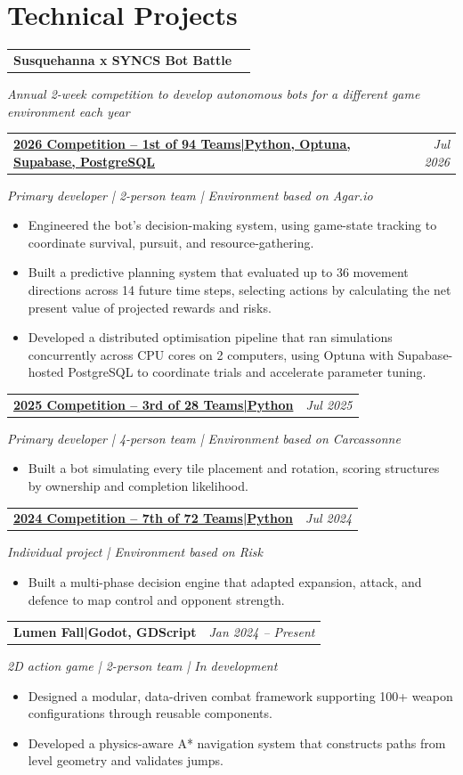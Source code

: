 \documentclass[10pt,a4paper]{article}
\makeatletter
\newcommand{\projectgroup}[2]{%
  \vspace{3pt}
  \begin{tabularx}{\textwidth}{@{}Xr@{}}
    \textbf{#1} & \textit{#2}
  \end{tabularx}\vspace{-1pt}
}
\newcommand{\project}[3]{%
  \vspace{6pt}
  \begin{tabularx}{\textwidth}{@{}Xr@{}}
    \textbf{#1\enspace|\enspace#2} & \textit{#3}
  \end{tabularx}\vspace{-1pt}
}
\newcommand{\linkedprojectyear}[4]{%
  \begin{tabularx}{\textwidth}{@{}Xr@{}}
    \textbf{\href{#1}{#2\enspace|\enspace#3}} & \textit{#4}
  \end{tabularx}\vspace{-1pt}
}
\newcommand{\projectcontext}[1]{%
  \textit{#1}\par\vspace{-1pt}
}
\makeatother
\begin{document}
\section{Technical Projects}

\projectgroup
  {Susquehanna x SYNCS Bot Battle}
  {}
\projectcontext{Annual 2-week competition to develop autonomous bots for a different game environment each year}
\linkedprojectyear{https://github.com/TimWJT/bot-battle-2026}{2026 Competition -- 1st of 94 Teams}{Python, Optuna, Supabase, PostgreSQL}{Jul 2026}
\projectcontext{Primary developer | 2-person team | Environment based on Agar.io}
\begin{itemize}
  \item Engineered the bot's decision-making system, using game-state tracking to coordinate survival, pursuit, and resource-gathering.
  \item Built a predictive planning system that evaluated up to 36 movement directions across 14 future time steps, selecting actions by calculating the net present value of projected rewards and risks.
  \item Developed a distributed optimisation pipeline that ran simulations concurrently across CPU cores on 2 computers, using Optuna with Supabase-hosted PostgreSQL to coordinate trials and accelerate parameter tuning.
\end{itemize}
\linkedprojectyear{https://github.com/TimWJT/syncs-bot-battle-2025-carcassonne}{2025 Competition -- 3rd of 28 Teams}{Python}{Jul 2025}
\projectcontext{Primary developer | 4-person team | Environment based on Carcassonne}
\begin{itemize}
  \item Built a bot simulating every tile placement and rotation, scoring structures by ownership and completion likelihood.
\end{itemize}
\linkedprojectyear{https://github.com/TimWJT/syncs-bot-battle-2024-risk}{2024 Competition -- 7th of 72 Teams}{Python}{Jul 2024}
\projectcontext{Individual project | Environment based on Risk}
\begin{itemize}
  \item Built a multi-phase decision engine that adapted expansion, attack, and defence to map control and opponent strength.
\end{itemize}

\project
  {Lumen Fall}
  {Godot, GDScript}
  {Jan 2024 -- Present}
\projectcontext{2D action game | 2-person team | In development}
\begin{itemize}
  \item Designed a modular, data-driven combat framework supporting 100+ weapon configurations through reusable components.
  \item Developed a physics-aware A* navigation system that constructs paths from level geometry and validates jumps.
\end{itemize}
\end{document}
